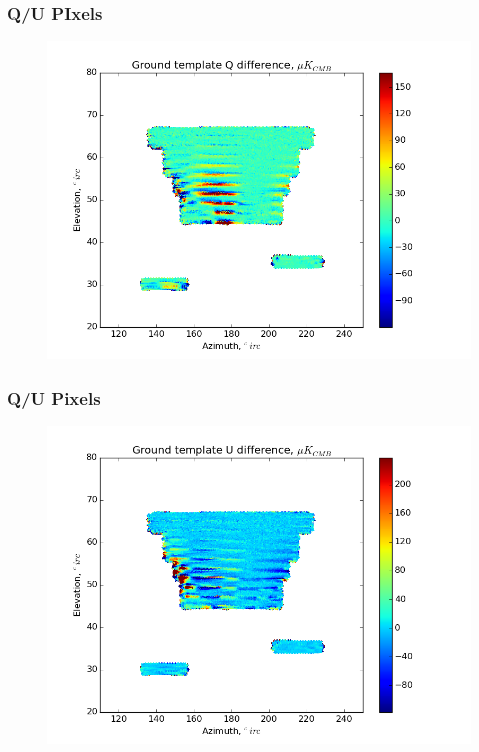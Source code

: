 \documentclass{beamer}
\begin{document}
\begin{frame}
\frametitle{Q/U PIxels}
\begin{figure}
\includegraphics[width=0.9\linewidth]{dQ_gt_QU_PIXEL.png}
\end{figure}
\end{frame}

\begin{frame}
\frametitle{Q/U Pixels}
\begin{figure}
\includegraphics[width=0.9\linewidth]{dU_gt_QU_PIXEL.png}
\end{figure}
\end{frame}
\end{document}
